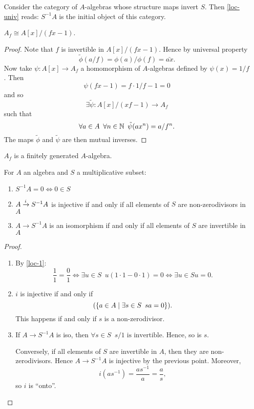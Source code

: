 \begin{corollary}
  Consider the category of $A$-algebras whose structure maps invert $S$. Then \cref{loc-univ} reads: $S^{-1}A$ is the initial object of this category.
\end{corollary}

\begin{lemma}
  \label{loc-1}
  $A_f \cong A[x] / {(fx-1)}$.
\end{lemma}

\begin{proof}
  Note that $f$ is invertible in $A[x] / {(fx-1)}$.
  Hence by universal property
  \[\tilde{\phi}(a / f) = \phi(a) / \phi(f) = \bar{ax}. \]
  Now take
  $\psi \colon A[x] \to A_f$ a homomorphism of $A$-algebras defined by $\psi(x) = 1 / f$.
  Then
  \[ \psi(fx - 1) = f \cdot 1 / f - 1 = 0 \]
  and so
  \[ \exists \tilde \psi \colon A[x] /{(xf-1)} \to A_f \]
  such that
  \[ \forall a \in A \enspace \forall n \in \mathbb N \enspace \tilde \psi (a x^n) = a / f^n.\]
  The maps $\tilde \phi$ and $\tilde \psi$ are then mutual inverses.
\end{proof}

\begin{corollary}
  $A_f$ is a finitely generated \(A\)-algebra.
\end{corollary}

\begin{lemma}
  For $A$ an algebra and $S$ a multiplicative subset:
  \begin{enumerate}
  \item $S^{-1}A = 0 \iff 0 \in S$
  \item $A \xrightarrow{i} S^{-1}A$ is injective if and only if all elements of $S$ are non-zerodivisors in $A$
  \item $A \to S^{-1}A$ is an isomorphism if and only if all elements of $S$ are invertible in $A$
  \end{enumerate}
\end{lemma}
\begin{proof}
  \begin{enumerate}
  \item By \cref{loc-1}:
    \[ \frac{1}{1} = \frac{0}{1} \iff \exists u \in S \enspace u(1 \cdot 1 - 0 \cdot 1 ) = 0 \iff \exists u \in S u = 0.\]
  \item $i$ is injective if and only if
    \[ (\{a \in A \mathrel{|} \exists s \in S \enspace sa = 0 \}).\]
    This happens if and only if $s$ is a non-zerodivisor.
  \item If $A \to S^{-1}A$ is iso, then $\forall s \in S \enspace s/1 \text{ is invertible}$.
    Hence, so is $s$.

    Conversely, if all elements of $S$ are invertible in $A$, then they are non-zerodivisors. Hence $A \to S^{-1}A$ is injective by the previous point.
    Moreover,
    \[i (a s^{-1}) = \frac{a s^{-1}}{a} = \frac{a}{s},\]
    so $i$ is ``onto''.
  \end{enumerate}
\end{proof}

